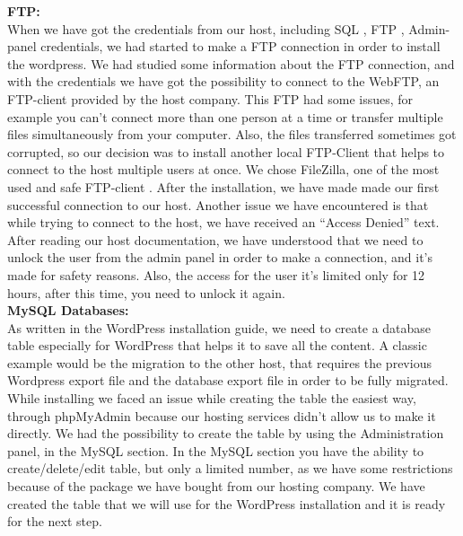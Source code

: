 \documentclass[12p]{article}
\begin{document}
\textbf{FTP:}
\\
When we have got the credentials from our host, including SQL \cite{mySQL}, FTP \cite{FTP}, Admin-panel credentials, we had started to make a FTP connection in order to install the wordpress. We had studied some information about the FTP connection, and with the credentials we have got the possibility to connect to the WebFTP, an FTP-client provided by the host company. This FTP had some issues, for example you can’t connect more than one person at a time or transfer multiple files simultaneously from your computer. Also, the files transferred sometimes got corrupted, so our decision was to install another local FTP-Client that helps to connect to the host multiple users at once. We chose FileZilla, one of the most used and safe FTP-client \cite{FileZilla}. After the installation, we have made made our first successful connection to our host. Another issue we have encountered is that while trying to connect to the host, we have received an “Access Denied” text. After reading our host documentation, we have understood that we need to unlock the user from the admin panel in order to make a connection, and it’s made for safety reasons. Also, the access for the user it’s limited only for 12 hours, after this time, you need to unlock it again. \\

\textbf{MySQL Databases:}
\\
As written in the WordPress installation guide, we need to create a database table especially for WordPress that helps it to save all the content. A classic example would be the migration to the other host, that requires the previous Wordpress export file and the database export file in order to be fully migrated. While installing we faced an issue while creating the table the easiest way, through phpMyAdmin because our hosting services didn’t allow us to make it directly. We had the possibility to create the table by using the Administration panel, in the MySQL section. In the MySQL section you have the ability to create/delete/edit table, but only a limited number, as we have some restrictions because of the package we have bought from our hosting company. We have created the table that we will use for the WordPress installation and it is ready for the next step. \\
\end{document}
